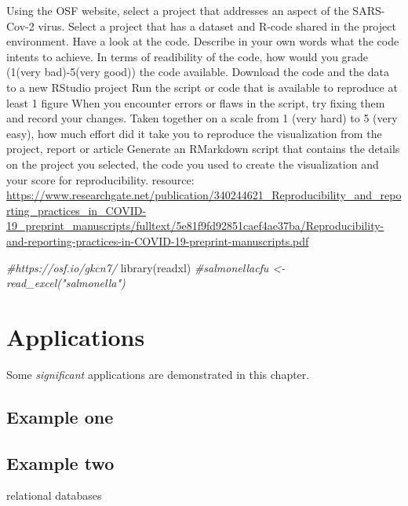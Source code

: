 \documentclass[
]{book}
\newenvironment{Shaded}{\begin{snugshade}}{\end{snugshade}}
\newcommand{\CommentTok}[1]{\textcolor[rgb]{0.56,0.35,0.01}{\textit{#1}}}
\newcommand{\FunctionTok}[1]{\textcolor[rgb]{0.00,0.00,0.00}{#1}}
\newcommand{\NormalTok}[1]{#1}
\begin{document}
Using the OSF website, select a project that addresses an aspect of the SARS-Cov-2 virus.
Select a project that has a dataset and R-code shared in the project environment.
Have a look at the code. Describe in your own words what the code intents to achieve.
In terms of readibility of the code, how would you grade (1(very bad)-5(very good)) the code available.
Download the code and the data to a new RStudio project
Run the script or code that is available to reproduce at least 1 figure
When you encounter errors or flaws in the script, try fixing them and record your changes.
Taken together on a scale from 1 (very hard) to 5 (very easy), how much effort did it take you to reproduce the visualization from the project, report or article
Generate an RMarkdown script that contains the details on the project you selected, the code you used to create the visualization and your score for reproducibility.
resource: \url{https://www.researchgate.net/publication/340244621_Reproducibility_and_reporting_practices_in_COVID-19_preprint_manuscripts/fulltext/5e81f9fd92851caef4ae37ba/Reproducibility-and-reporting-practices-in-COVID-19-preprint-manuscripts.pdf}

\begin{Shaded}
\begin{Highlighting}[]
\CommentTok{\#https://osf.io/gkcn7/}
\FunctionTok{library}\NormalTok{(readxl)}
\CommentTok{\#salmonellacfu \textless{}{-} read\_excel("salmonella")}
\end{Highlighting}
\end{Shaded}

\hypertarget{applications}{%
\chapter{Applications}\label{applications}}

Some \emph{significant} applications are demonstrated in this chapter.

\hypertarget{example-one}{%
\section{Example one}\label{example-one}}

\hypertarget{example-two}{%
\section{Example two}\label{example-two}}

relational databases
\end{document}

